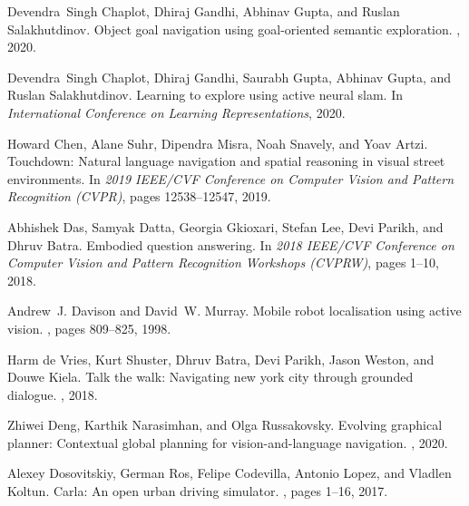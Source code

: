 \documentclass[final]{cvpr}
\begin{document}
\begin{thebibliography}{10}
    Devendra~Singh {Chaplot}, Dhiraj {Gandhi}, Abhinav {Gupta}, and Ruslan
      {Salakhutdinov}.
    \newblock Object goal navigation using goal-oriented semantic exploration.
    , 2020.
    
    Devendra~Singh {Chaplot}, Dhiraj {Gandhi}, Saurabh {Gupta}, Abhinav {Gupta},
      and Ruslan {Salakhutdinov}.
    \newblock Learning to explore using active neural slam.
    \newblock In {\em International Conference on Learning Representations}, 2020.
    
    Howard {Chen}, Alane {Suhr}, Dipendra {Misra}, Noah {Snavely}, and Yoav
      {Artzi}.
    \newblock Touchdown: Natural language navigation and spatial reasoning in
      visual street environments.
    \newblock In {\em 2019 IEEE/CVF Conference on Computer Vision and Pattern
      Recognition (CVPR)}, pages 12538--12547, 2019.
    
    Abhishek {Das}, Samyak {Datta}, Georgia {Gkioxari}, Stefan {Lee}, Devi
      {Parikh}, and Dhruv {Batra}.
    \newblock Embodied question answering.
    \newblock In {\em 2018 IEEE/CVF Conference on Computer Vision and Pattern
      Recognition Workshops (CVPRW)}, pages 1--10, 2018.
    
    Andrew~J. {Davison} and David~W. {Murray}.
    \newblock Mobile robot localisation using active vision.
    , pages 809--825, 1998.
    
    Harm de Vries, Kurt Shuster, Dhruv Batra, Devi Parikh, Jason Weston, and Douwe
      Kiela.
    \newblock Talk the walk: Navigating new york city through grounded dialogue.
    , 2018.
    
    Zhiwei {Deng}, Karthik {Narasimhan}, and Olga {Russakovsky}.
    \newblock Evolving graphical planner: Contextual global planning for
      vision-and-language navigation.
    , 2020.
    
    Alexey {Dosovitskiy}, German {Ros}, Felipe {Codevilla}, Antonio {Lopez}, and
      Vladlen {Koltun}.
    \newblock Carla: An open urban driving simulator.
    , pages 1--16, 2017.
    

\end{thebibliography}
\end{document}
